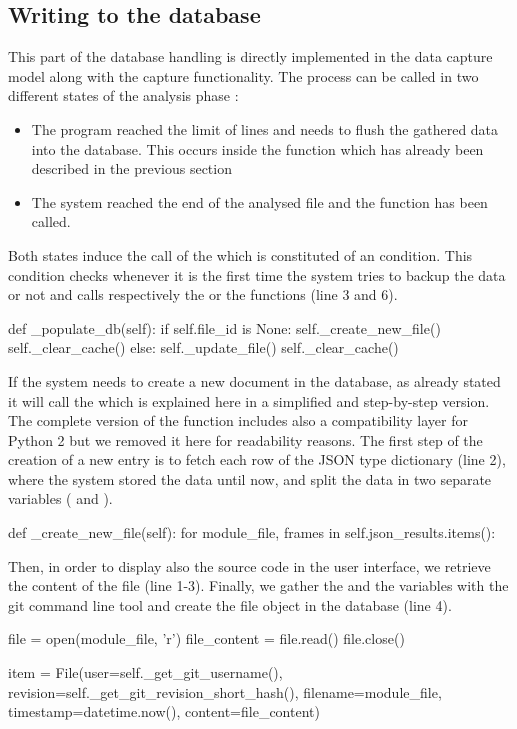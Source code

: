 \subsection{Writing to the database}
This part of the database handling is directly implemented in the data capture model along with the capture functionality. The process can be called in two different states of the analysis phase : 
\begin{itemize}
  \item The program reached the limit of lines and needs to flush the gathered data into the database. This occurs inside the  function which has already been described in the previous section
  \item The system reached the end of the analysed file and the function  has been called.
\end{itemize}
Both states induce the call of the  which is constituted of an  condition. This condition checks whenever it is the first time the system tries to backup the data or not and calls respectively the  or the  functions (line 3 and 6).
\begin{python}
def _populate_db(self):
    if self.file_id is None:
        self._create_new_file()
        self._clear_cache()
    else:
        self._update_file()
        self._clear_cache()
\end{python}

If the system needs to create a new document in the database, as already stated it will call the  which is explained here in a simplified and step-by-step version. The complete version of the function includes also a compatibility layer for Python 2 but we removed it here for readability reasons. The first step of the creation of a new entry is to fetch each row of the JSON type dictionary (line 2), where the system stored the data  until now, and split the data in two separate variables ( and ).
\begin{python}
def _create_new_file(self):
  for module_file, frames in self.json_results.items():
\end{python}
 
Then, in order to display also the source code in the user interface, we retrieve the content of the file (line 1-3). Finally, we gather the  and the  variables with the git command line tool and create the file object in the database (line 4).
\begin{python}
file = open(module_file, 'r')
file_content = file.read()
file.close()

item = File(user=self._get_git_username(), revision=self._get_git_revision_short_hash(), filename=module_file, timestamp=datetime.now(), content=file_content)
\end{python}

